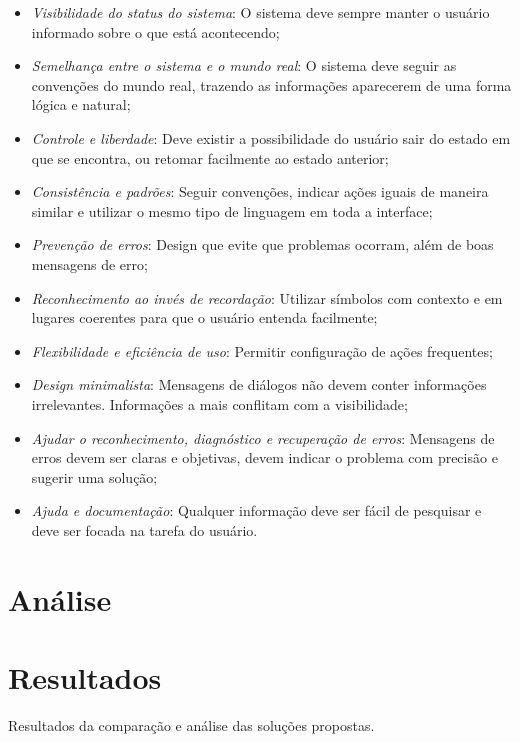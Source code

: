 \begin{itemize}
    \begin{itemize}
        \item \textit{Visibilidade do status do sistema}: O sistema deve sempre manter o usuário informado sobre o que está acontecendo;
        \item \textit{Semelhança entre o sistema e o mundo real}: O sistema deve seguir as convenções do mundo real, trazendo as informações aparecerem de uma forma lógica e natural;
        \item \textit{Controle e liberdade}: Deve existir a possibilidade do usuário sair do estado em que se encontra, ou retomar facilmente ao estado anterior;
        \item \textit{Consistência e padrões}: Seguir convenções, indicar ações iguais de maneira similar e utilizar o mesmo tipo de linguagem em toda a interface;
        \item \textit{Prevenção de erros}: Design que evite que problemas ocorram, além de boas mensagens de erro;
        \item \textit{Reconhecimento ao invés de recordação}: Utilizar símbolos com contexto e em lugares coerentes para que o usuário entenda facilmente;
        \item \textit{Flexibilidade e eficiência de uso}: Permitir configuração de ações frequentes;
        \item \textit{Design minimalista}: Mensagens de diálogos não devem conter informações irrelevantes. Informações a mais conflitam com a visibilidade;
        \item \textit{Ajudar o reconhecimento, diagnóstico e recuperação de erros}: Mensagens de erros devem ser claras e objetivas, devem indicar o problema com precisão e sugerir uma solução;
        \item \textit{Ajuda e documentação}: Qualquer informação deve ser fácil de pesquisar e deve ser focada na tarefa do usuário.
    \end{itemize}
\end{itemize}

\section{Análise}







\section{Resultados}
Resultados da comparação e análise das soluções propostas.
